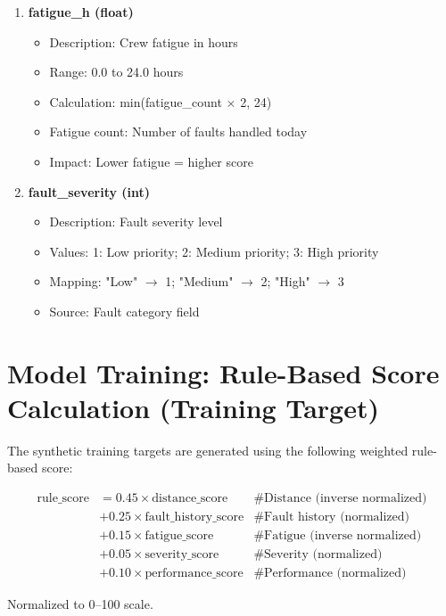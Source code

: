 \begin{enumerate}
    \item \textbf{fatigue\_h (float)}
    \begin{itemize}
        \item Description: Crew fatigue in hours
        \item Range: 0.0 to 24.0 hours
        \item Calculation: min(fatigue\_count $\times$ 2, 24)
        \item Fatigue count: Number of faults handled today
        \item Impact: Lower fatigue = higher score
    \end{itemize}
    
    \item \textbf{fault\_severity (int)}
    \begin{itemize}
        \item Description: Fault severity level
        \item Values: 1: Low priority; 2: Medium priority; 3: High priority
        \item Mapping: "Low" $\to$ 1; "Medium" $\to$ 2; "High" $\to$ 3
        \item Source: Fault category field
    \end{itemize}
\end{enumerate}

\section{Model Training: Rule-Based Score Calculation (Training Target)}

The synthetic training targets are generated using the following weighted rule-based score:

\begin{align*}
\text{rule\_score} &= 0.45 \times \text{distance\_score} & \text{\# Distance (inverse normalized)} \\
&+ 0.25 \times \text{fault\_history\_score} & \text{\# Fault history (normalized)} \\
&+ 0.15 \times \text{fatigue\_score} & \text{\# Fatigue (inverse normalized)} \\
&+ 0.05 \times \text{severity\_score} & \text{\# Severity (normalized)} \\
&+ 0.10 \times \text{performance\_score} & \text{\# Performance (normalized)}
\end{align*}

Normalized to 0–100 scale.

